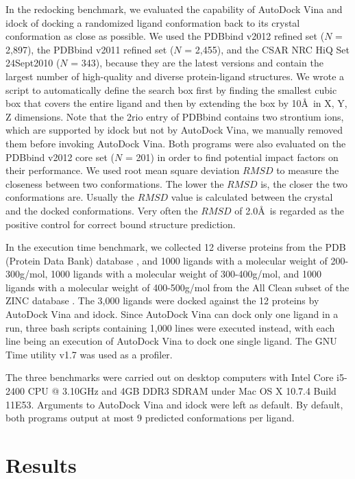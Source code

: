 In the redocking benchmark, we evaluated the capability of AutoDock Vina and idock of docking a randomized ligand conformation back to its crystal conformation as close as possible. We used the PDBbind v2012 refined set ($N$ = 2,897), the PDBbind v2011 refined set ($N$ = 2,455), and the CSAR NRC HiQ Set 24Sept2010 ($N$ = 343), because they are the latest versions and contain the largest number of high-quality and diverse protein-ligand structures. We wrote a script to automatically define the search box first by finding the smallest cubic box that covers the entire ligand and then by extending the box by 10\AA\ in X, Y, Z dimensions. Note that the 2rio entry of PDBbind contains two strontium ions, which are supported by idock but not by AutoDock Vina, we manually removed them before invoking AutoDock Vina. Both programs were also evaluated on the PDBbind v2012 core set ($N$ = 201) in order to find potential impact factors on their performance. We used root mean square deviation $RMSD$ to measure the closeness between two conformations. The lower the $RMSD$ is, the closer the two conformations are. Usually the $RMSD$ value is calculated between the crystal and the docked conformations. Very often the $RMSD$ of 2.0\AA\ is regarded as the positive control for correct bound structure prediction. 

In the execution time benchmark, we collected 12 diverse proteins from the PDB (Protein Data Bank) database \citep{540,537}, and 1000 ligands with a molecular weight of 200-300g/mol, 1000 ligands with a molecular weight of 300-400g/mol, and 1000 ligands with a molecular weight of 400-500g/mol from the All Clean subset of the ZINC database \citep{532,1178}. The 3,000 ligands were docked against the 12 proteins by AutoDock Vina and idock. Since AutoDock Vina can dock only one ligand in a run, three bash scripts containing 1,000 lines were executed instead, with each line being an execution of AutoDock Vina to dock one single ligand. The GNU Time utility v1.7 was used as a profiler.

The three benchmarks were carried out on desktop computers with Intel Core i5-2400 CPU @ 3.10GHz and 4GB DDR3 SDRAM under Mac OS X 10.7.4 Build 11E53. Arguments to AutoDock Vina and idock were left as default. By default, both programs output at most 9 predicted conformations per ligand.

\section{Results}

